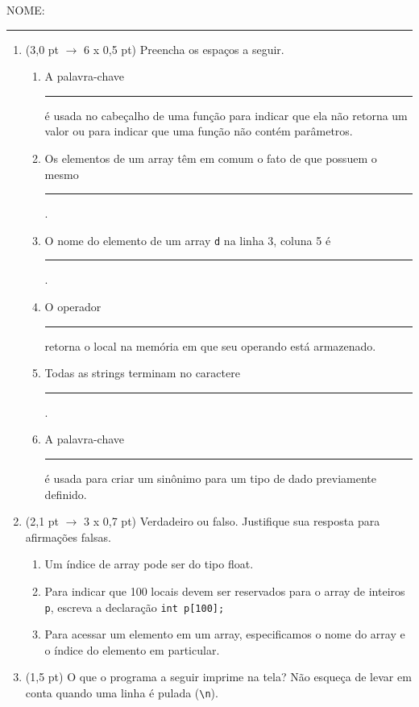 \documentclass[a4paper,10pt]{article}
\begin{document}


NOME: \rule{.85\textwidth}{0.1mm}

\begin{multicols*}{2}
\setlength{\leftmargini}{0pt}
\begin{enumerate}
  \item (3,0 pt $\rightarrow$ 6 x 0,5 pt) Preencha os espaços a seguir.

  \begin{enumerate}
    \item A palavra-chave \rule{1cm}{0.2mm} é usada no cabeçalho de uma função para indicar que ela não retorna um valor ou para indicar que uma função não contém parâmetros. %
    \item Os elementos de um array têm em comum o fato de que possuem o mesmo \rule{1cm}{0.2mm}. %
    \item O nome do elemento de um array \texttt{d} na linha 3, coluna 5 é \rule{1cm}{0.2mm}. %
    \item O operador \rule{1cm}{0.2mm} retorna o local na memória em que seu operando está armazenado. %
    \item Todas as strings terminam no caractere \rule{1cm}{0.2mm}. %
    \item A palavra-chave \rule{1cm}{0.2mm} é usada para criar um sinônimo para um tipo de dado previamente definido. %
  \end{enumerate}

  \item (2,1 pt $\rightarrow$ 3 x 0,7 pt) Verdadeiro ou falso. Justifique sua resposta para afirmações falsas.

  \begin{enumerate}
    \item Um índice de array pode ser do tipo float. %
    \item Para indicar que 100 locais devem ser reservados para o array de inteiros \texttt{p}, escreva a declaração \texttt{int p[100];} %
    \item Para acessar um elemento em um array, especificamos o nome do array e o índice do elemento em particular. %
  \end{enumerate}

  \item (1,5 pt) O que o programa a seguir imprime na tela? Não esqueça de levar em conta quando uma linha é pulada (\texttt{\textbackslash n}).


\end{enumerate}
\end{multicols*}
\end{document}

